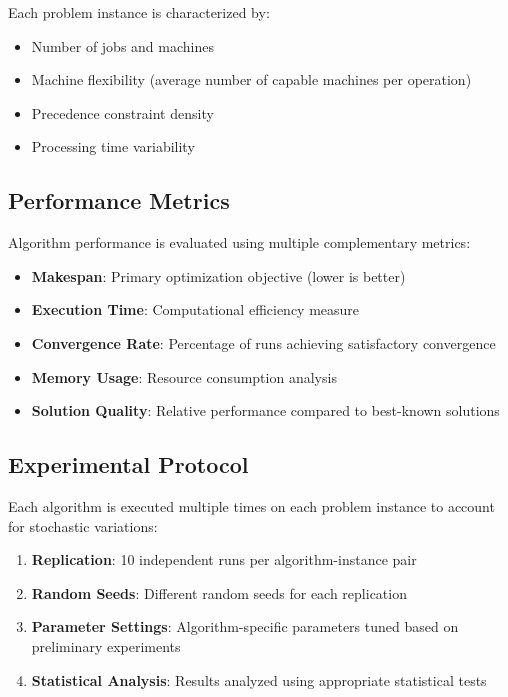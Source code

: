 \documentclass[11pt,a4paper]{article}
\begin{document}
Each problem instance is characterized by:
\begin{itemize}
    \item Number of jobs and machines
    \item Machine flexibility (average number of capable machines per operation)
    \item Precedence constraint density
    \item Processing time variability
\end{itemize}

\subsection{Performance Metrics}

Algorithm performance is evaluated using multiple complementary metrics:

\begin{itemize}
    \item \textbf{Makespan}: Primary optimization objective (lower is better)
    \item \textbf{Execution Time}: Computational efficiency measure
    \item \textbf{Convergence Rate}: Percentage of runs achieving satisfactory convergence
    \item \textbf{Memory Usage}: Resource consumption analysis
    \item \textbf{Solution Quality}: Relative performance compared to best-known solutions
\end{itemize}

\subsection{Experimental Protocol}

Each algorithm is executed multiple times on each problem instance to account for stochastic variations:

\begin{enumerate}
    \item \textbf{Replication}: 10 independent runs per algorithm-instance pair
    \item \textbf{Random Seeds}: Different random seeds for each replication
    \item \textbf{Parameter Settings}: Algorithm-specific parameters tuned based on preliminary experiments
    \item \textbf{Statistical Analysis}: Results analyzed using appropriate statistical tests
\end{enumerate}
\end{document}
